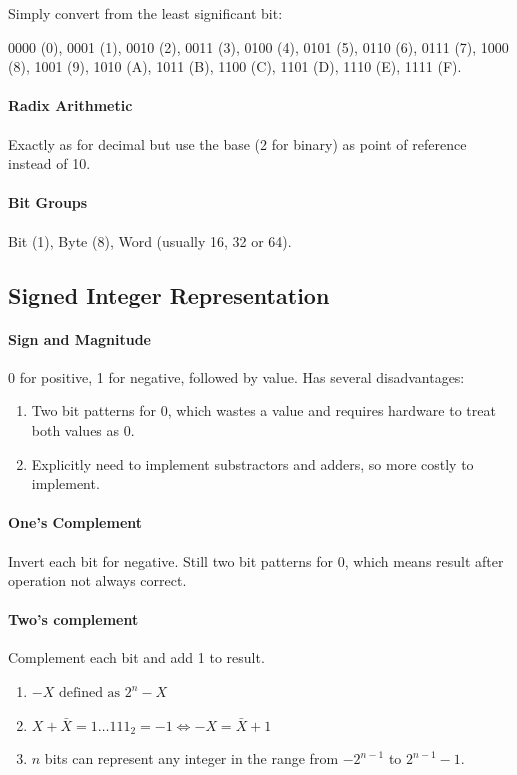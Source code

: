 \documentclass[twocolumn,english]{article}
\begin{document}
Simply convert from the least significant bit:

0000 (0), 0001 (1), 0010 (2), 0011 (3), 0100 (4), 0101 (5), 0110 (6),
0111 (7), 1000 (8), 1001 (9), 1010 (A), 1011 (B), 1100 (C), 1101 (D),
1110 (E), 1111 (F).


\paragraph{Radix Arithmetic}

Exactly as for decimal but use the base (2 for binary) as point of
reference instead of 10.


\paragraph{Bit Groups}

Bit (1), Byte (8), Word (usually 16, 32 or 64).


\subsection{Signed Integer Representation}


\paragraph{Sign and Magnitude}

0 for positive, 1 for negative, followed by value. Has several disadvantages:
\begin{enumerate}
\item Two bit patterns for 0, which wastes a value and requires hardware
to treat both values as 0.
\item Explicitly need to implement substractors and adders, so more costly
to implement.
\end{enumerate}

\paragraph{One's Complement}

Invert each bit for negative. Still two bit patterns for 0, which
means result after operation not always correct.


\paragraph{Two's complement}

Complement each bit and add 1 to result.
\begin{enumerate}
\item $-X\mbox{ defined as }2^{n}-X$
\item $X+\bar{X}=1\dots111_{2}=-1\iff-X=\bar{X}+1$
\item $n$ bits can represent any integer in the range from $-2^{n-1}$
to $2^{n-1}-1$.
\end{enumerate}
\end{document}
